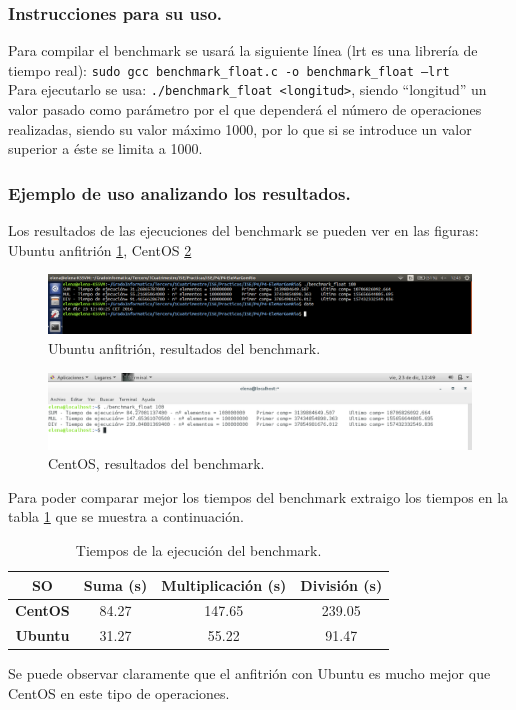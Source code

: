 \subsubsection{Instrucciones para su uso.}
Para compilar el benchmark se usará la siguiente línea (lrt es una librería de tiempo real): 
\texttt{sudo gcc benchmark\_float.c -o benchmark\_float –lrt}\\

Para ejecutarlo se usa: \texttt{./benchmark\_float <longitud>}, siendo ``longitud'' un valor pasado como parámetro por el que dependerá el número de operaciones realizadas, siendo su valor máximo 1000, por lo que si se introduce un valor superior a éste se limita a 1000.


\subsubsection{Ejemplo de uso analizando los resultados.}

Los resultados de las ejecuciones del benchmark se pueden ver en las figuras: Ubuntu anfitrión \ref{fig:ejercicio5_1}, CentOS \ref{fig:ejercicio5_2} 

\begin{figure}[H] 
	\centering
	\includegraphics[width=14.7cm]{./img/ejercicio5_1.png} 	
	\caption{Ubuntu anfitrión, resultados del benchmark.} \label{fig:ejercicio5_1}
\end{figure}

\begin{figure}[H] 
	\centering
	\includegraphics[width=14.7cm]{./img/ejercicio5_2.png} 	
	\caption{CentOS, resultados del benchmark.} \label{fig:ejercicio5_2}
\end{figure}


Para poder comparar mejor los tiempos del benchmark extraigo los tiempos en la tabla \ref{comparativa_bench} que se muestra a continuación.

\begin{table}[H]
\centering
\small
\setlength\tabcolsep{2pt}
\caption{Tiempos de la ejecución del benchmark.}
\label{comparativa_bench}
\begin{tabular}{|c|c|c|c|}
\hline
\textbf{SO}      & \textbf{Suma (s)} & \textbf{Multiplicación (s)} & \textbf{División (s)}  \\ \hline
\textbf{CentOS}  & 84.27          & 147.65             & 239.05 \\ \hline
\textbf{Ubuntu}  & 31.27         & 55.22          & 91.47                  \\ \hline
\end{tabular}
\end{table}

Se puede observar claramente que el anfitrión con Ubuntu es mucho mejor que CentOS en este tipo de operaciones.





